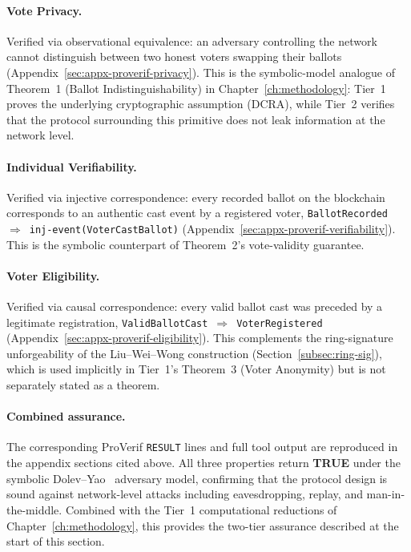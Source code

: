 \paragraph{Vote Privacy.} Verified via observational equivalence: an adversary controlling the network cannot distinguish between two honest voters swapping their ballots (Appendix~\ref{sec:appx-proverif-privacy}). This is the symbolic-model analogue of Theorem~1 (Ballot Indistinguishability) in Chapter~\ref{ch:methodology}: Tier~1 proves the underlying cryptographic assumption (DCRA), while Tier~2 verifies that the protocol surrounding this primitive does not leak information at the network level.

\paragraph{Individual Verifiability.} Verified via injective correspondence: every recorded ballot on the blockchain corresponds to an authentic cast event by a registered voter, \texttt{BallotRecorded}~$\Longrightarrow$~\texttt{inj-event(VoterCastBallot)} (Appendix~\ref{sec:appx-proverif-verifiability}). This is the symbolic counterpart of Theorem~2's vote-validity guarantee.

\paragraph{Voter Eligibility.} Verified via causal correspondence: every valid ballot cast was preceded by a legitimate registration, \texttt{ValidBallotCast}~$\Longrightarrow$~\texttt{VoterRegistered} (Appendix~\ref{sec:appx-proverif-eligibility}). This complements the ring-signature unforgeability of the Liu--Wei--Wong construction (Section~\ref{subsec:ring-sig}), which is used implicitly in Tier~1's Theorem~3 (Voter Anonymity) but is not separately stated as a theorem.

\paragraph{Combined assurance.} The corresponding ProVerif \texttt{RESULT} lines and full tool output are reproduced in the appendix sections cited above. All three properties return \textbf{TRUE} under the symbolic Dolev--Yao~\cite{dolev1983} adversary model, confirming that the protocol design is sound against network-level attacks including eavesdropping, replay, and man-in-the-middle. Combined with the Tier~1 computational reductions of Chapter~\ref{ch:methodology}, this provides the two-tier assurance described at the start of this section.

